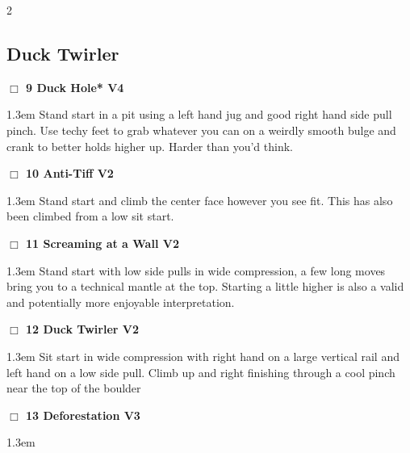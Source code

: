 	\begin{multicols}{2}
\needspace{10em}
\subsection*{Duck Twirler}\label{bf:Duck Twirler}
\needspace{2em}
\label{rt:DT 1}
\colorbox{RoyalBlue!20}{
\parbox{0.95\linewidth}{
\hspace{-1ex}\textbf{$\Box$
9 Duck Hole* V4  
}}}
\begin{adjustwidth}{1.3em}{}			
Stand start in a pit using a left hand jug and good right hand side pull pinch. Use techy feet to grab whatever you can on a weirdly smooth bulge and crank to better holds higher up. Harder than you'd think.
\end{adjustwidth}
\needspace{2em}
\label{rt:Anti-Tiff}
\colorbox{green!20}{
\parbox{0.95\linewidth}{
\hspace{-1ex}\textbf{$\Box$
10 Anti-Tiff V2  
}}}
\begin{adjustwidth}{1.3em}{}			
Stand start and climb the center face however you see fit. This has also been climbed from a low sit start.
\end{adjustwidth}
\needspace{2em}
\label{rt:Screaming at a Wall}
\colorbox{green!20}{
\parbox{0.95\linewidth}{
\hspace{-1ex}\textbf{$\Box$
11 Screaming at a Wall V2  
}}}
\begin{adjustwidth}{1.3em}{}			
Stand start with low side pulls in wide compression, a few long moves bring you to a technical mantle at the top. Starting a little higher is also a valid and potentially more enjoyable interpretation.
\end{adjustwidth}
\needspace{2em}
\label{rt:Duck Twirler}
\colorbox{green!20}{
\parbox{0.95\linewidth}{
\hspace{-1ex}\textbf{$\Box$
12 Duck Twirler V2  
}}}
\begin{adjustwidth}{1.3em}{}			
Sit start in wide compression with right hand on a large vertical rail and left hand on a low side pull. Climb up and right finishing through a cool pinch near the top of the boulder
\end{adjustwidth}
\needspace{2em}
\label{rt:Deforestation}
\colorbox{green!20}{
\parbox{0.95\linewidth}{
\hspace{-1ex}\textbf{$\Box$
13 Deforestation V3  
}}}
\begin{adjustwidth}{1.3em}{}			

\end{adjustwidth}
\end{multicols}
